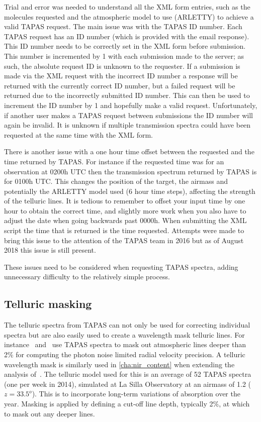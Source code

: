 Trial and error was needed to understand all the {XML} form entries, such as the molecules requested and the atmospheric model to use ({ARLETTY}) to achieve a valid {TAPAS} request.
The main issue was with the {TAPAS} {{ID}} number.
Each {TAPAS} request has an {ID} number (which is provided with the email response).
This {ID} number needs to be correctly set in the {XML} form before submission.
This number is incremented by 1 with each submission made to the server; as such, the absolute request ID is unknown to the requester.
If a submission is made via the {XML} request with the incorrect {ID} number a response will be returned with the currently correct {ID} number, but a failed request will be returned due to the incorrectly submitted ID number.
This can then be used to increment the {ID} number by 1 and hopefully make a valid request.
Unfortunately, if another user makes a {TAPAS} request between submissions the {ID} number will again be invalid.
It is unknown if multiple transmission spectra could have been requested at the same time with the {XML} form.

There is another issue with a one hour time offset between the requested and the time returned by {TAPAS}.
For instance if the requested time was for an observation at 0200h {UTC} then the transmission spectrum returned by {TAPAS} is for 0100h {UTC}.
This changes the position of the target, the airmass and potentially the {ARLETTY} model used (6 hour time steps), affecting the strength of the telluric lines.
It is tedious to remember to offset your input time by one hour to obtain the correct time, and slightly more work when you also have to adjust the date when going backwards past 0000h.
When submitting the {XML} script the time that is returned is the time requested.
Attempts were made to bring this issue to the attention of the {TAPAS} team in 2016 but as of August 2018 this issue is still present.

These issues need to be considered when requesting {TAPAS} spectra, adding unnecessary difficulty to the relatively simple process.


\subsection{Telluric masking}
The telluric spectra from {TAPAS} can not only be used for correcting individual spectra but are also easily used to create a wavelength mask telluric lines.
For instance~\citet{figueira_radial_2016} and~\citet{artigau_optical_2018} use {TAPAS} spectra to mask out atmospheric lines deeper than 2\% for computing the photon noise limited radial velocity precision.
A telluric wavelength mask is similarly used in \cref{cha:nir_content} when extending the analysis of~\citet{figueira_radial_2016}.
The telluric model used for this is an average of 52 {TAPAS} spectra (one per week in 2014), simulated at La Silla Observatory at an airmass of 1.2 (\(z = 33.5^{o}\)).
This is to incorporate long-term variations of absorption over the year.
Masking is applied by defining a cut-off line depth, typically 2\%, at which to mask out any deeper lines.
